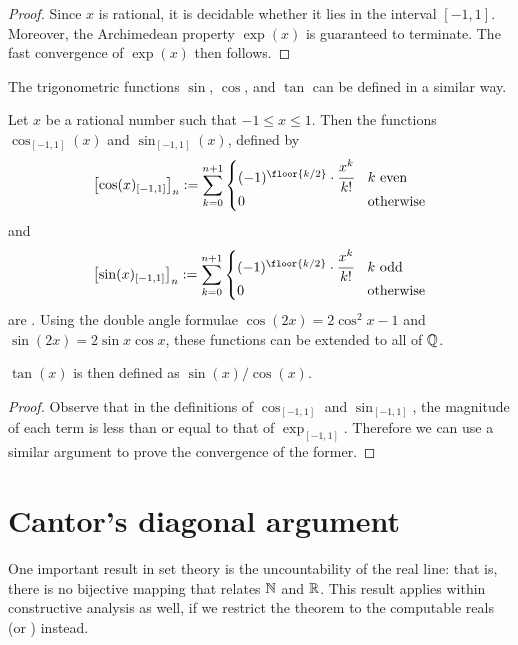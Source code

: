 \documentclass[leqno]{report}
\begin{document}
\begin{proof}
    Since $x$ is rational, it is decidable whether it lies in the interval $[-1, 1]$. Moreover, the Archimedean property $\exp(x)$ is guaranteed to terminate. The fast convergence of $\exp(x)$ then follows.
\end{proof}

The trigonometric functions $\sin$, $\cos$, and $\tan$ can be defined in a similar way.

\begin{Proposition}
    Let $x$ be a rational number such that $-1 \leq x \leq 1$. Then the functions $\cos_{[-1,1]}(x)$ and $\sin_{[-1,1]}(x)$, defined by
    \[
        \left[\cos(x)_{[-1,1]}\right]_n
        := \sum_{k=0}^{n+1} \begin{cases}
            (-1)^{\floor{k/2}} \cdot \cfrac{x^k}{k!} & k\ \mathrm{even} \\
            0 & \mathrm{otherwise}
        \end{cases}
    \]
    and
    \[
        \left[\sin(x)_{[-1,1]}\right]_n
        := \sum_{k=0}^{n+1} \begin{cases}
            (-1)^{\floor{k/2}} \cdot \cfrac{x^k}{k!} & k\ \mathrm{odd} \\
            0 & \mathrm{otherwise}
        \end{cases}
    \]
    are \FCCS. Using the double angle formulae $\cos(2x) = 2 \cos^2 x - 1$ and $\sin(2x) = 2 \sin x \cos x$, these functions can be extended to all of $\mathbb{Q}$.

    $\tan(x)$ is then defined as $\sin(x) / \cos(x)$.
\end{Proposition}

\begin{proof}
    Observe that in the definitions of $\cos_{[-1,1]}$ and $\sin_{[-1,1]}$, the magnitude of each term is less than or equal to that of $\exp_{[-1,1]}$. Therefore we can use a similar argument to prove the convergence of the former.
\end{proof}

\section{Cantor's diagonal argument}

One important result in set theory is the uncountability of the real line: that is, there is no bijective mapping that relates $\mathbb{N}$ and $\mathbb{R}$. This result applies within constructive analysis as well, if we restrict the theorem to the computable reals (or \FCCS) instead.
\end{document}
